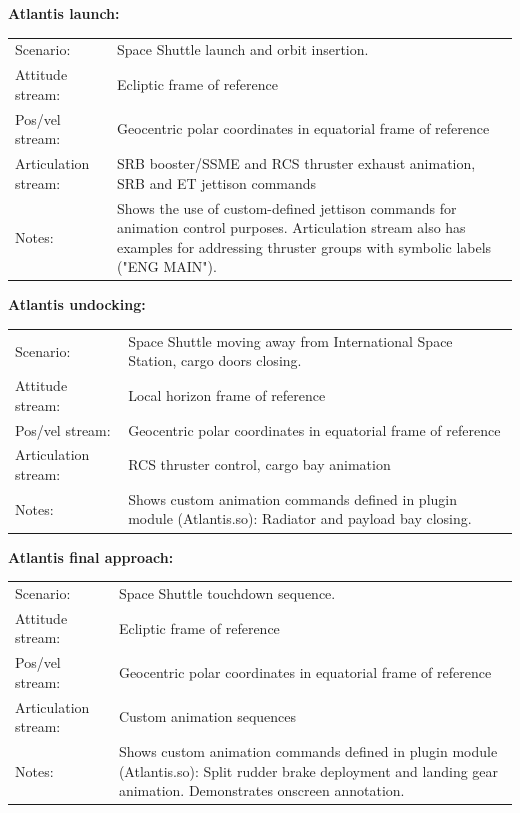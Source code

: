 \documentclass[Orbiter Technical Reference.tex]{subfiles}
\begin{document}
\noindent
\textbf{Atlantis launch:}
\begin{table}[H]
	\centering
	\begin{tabularx}{\textwidth}{ l X }
	Scenario: & Space Shuttle launch and orbit insertion.\\
	Attitude stream: & Ecliptic frame of reference\\
	Pos/vel stream: & Geocentric polar coordinates in equatorial frame of reference\\
	Articulation stream: & SRB booster/SSME and RCS thruster exhaust animation, SRB and ET jettison commands\\
	Notes: & Shows the use of custom-defined jettison commands for animation control purposes. Articulation stream also has examples for addressing thruster groups with symbolic labels ("ENG MAIN").\\
	\end{tabularx}
\end{table}

\noindent
\textbf{Atlantis undocking:}
\begin{table}[H]
	\centering
	\begin{tabularx}{\textwidth}{ l X }
	Scenario: & Space Shuttle moving away from International Space Station, cargo doors closing.\\
	Attitude stream: & Local horizon frame of reference\\
	Pos/vel stream: & Geocentric polar coordinates in equatorial frame of reference\\
	Articulation stream: & RCS thruster control, cargo bay animation\\
	Notes: & Shows custom animation commands defined in plugin module (Atlantis.so): Radiator and payload bay closing.\\
	\end{tabularx}
\end{table}

\noindent
\textbf{Atlantis final approach:}
\begin{table}[H]
	\centering
	\begin{tabularx}{\textwidth}{ l X }
	Scenario: & Space Shuttle touchdown sequence.\\
	Attitude stream: & Ecliptic frame of reference\\
	Pos/vel stream: & Geocentric polar coordinates in equatorial frame of reference\\
	Articulation stream: & Custom animation sequences\\
	Notes: & Shows custom animation commands defined in plugin module (Atlantis.so): Split rudder brake deployment and landing gear animation. Demonstrates onscreen annotation.\\
	\end{tabularx}
\end{table}
\end{document}
